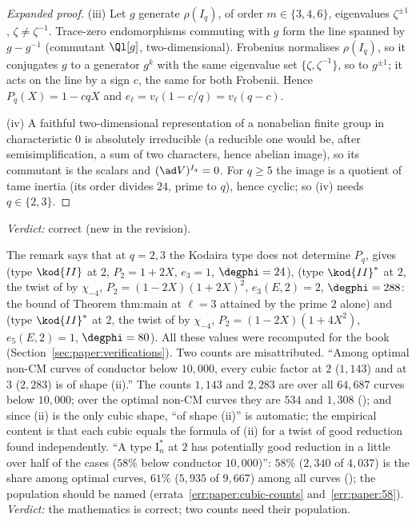 \begin{sloppypar}
\begin{proof}[Expanded proof]
(iii) Let $g$ generate $\rho(I_q)$, of order $m\in\{3,4,6\}$, eigenvalues $\zeta^{\pm1}$, $\zeta\ne\zeta^{-1}$. Trace-zero endomorphisms commuting with $g$ form the line spanned by $g-g^{-1}$
(commutant $\Ql[g]$, two-dimensional). Frobenius normalises $\rho(I_q)$, so it conjugates $g$ to a generator $g^k$ with the same eigenvalue set $\{\zeta,\zeta^{-1}\}$, so to $g^{\pm1}$; it acts on
the line by a sign $c$, the same for both Frobenii. Hence $P_q(X)=1-cqX$ and $e_\ell=v_\ell(1-c/q)=v_\ell(q-c)$.

(iv) A faithful two-dimensional representation of a nonabelian finite group in characteristic $0$ is absolutely irreducible (a reducible one would be, after
semisimplification, a sum of two characters, hence abelian image), so its commutant is the scalars and $(\ad V)^{I_q}=0$. For $q\ge5$ the image is a quotient of tame
inertia (its order divides $24$, prime to $q$), hence cyclic; so (iv) needs $q\in\{2,3\}$.
\end{proof}

\noindent\emph{Verdict:} correct (new in the revision).

\begin{remark}\label{rem:paper:wild}
The remark says that at $q=2,3$ the Kodaira type does not determine $P_q$, gives  (type $\kod{II}$ at $2$, $P_2=1+2X$, $e_3=1$, $\degphi=24$),  (type
$\kod{II}^*$ at $2$, the twist of  by $\chi_{-4}$, $P_2=(1-2X)(1+2X)^2$, $e_3(E,2)=2$, $\degphi=288$: the bound of Theorem thm:main at $\ell=3$ attained by the prime $2$ alone) and
 (type $\kod{II}^*$ at $2$, the twist of  by $\chi_{-4}$, $P_2=(1-2X)(1+4X^2)$, $e_5(E,2)=1$, $\degphi=80$). All these values were recomputed for the book
(Section~\ref{sec:paper:verifications}). Two counts are misattributed. ``Among optimal non-CM curves of conductor below $10{,}000$, every cubic factor at $2$ ($1{,}143$) and
at $3$ ($2{,}283$) is of shape (ii).'' The counts $1{,}143$ and $2{,}283$ are over all $64{,}687$ curves below $10{,}000$; over the optimal non-CM curves they are $534$ and $1{,}308$
(); and since (ii) is the only cubic shape, ``of shape (ii)'' is automatic; the empirical content is that each cubic equals the formula of (ii) for a twist
of good reduction found independently. ``A type $\mathrm{I}_n^*$ at $2$ has potentially good reduction in a little over half of the cases ($58\%$ below conductor $10{,}000$)'':
$58\%$ ($2{,}340$ of $4{,}037$) is the share among optimal curves, $61\%$ ($5{,}935$ of $9{,}667$) among all curves (); the population should be named
(errata~\ref{err:paper:cubic-counts} and~\ref{err:paper:58}). \emph{Verdict:} the mathematics is correct; two counts need their population.
\end{remark}


\end{sloppypar}
